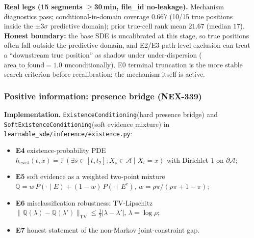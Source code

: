 \documentclass[11pt]{article}
\newcommand{\Aregion}{\mathcal{A}}
\renewcommand{\P}[1]{\mathbb{P}\left(#1\right)}
\newcommand{\ExistName}{\texttt{ExistenceConditioning}}
\newcommand{\SoftExistName}{\texttt{SoftExistenceConditioning}}
\begin{document}
\textbf{Real legs (15 segments $\ge$30\,min, file\_id no-leakage).}
Mechanism diagnostics pass; conditional-in-domain coverage $0.667$ (10/15
true positions inside the $\pm3\sigma$ predictive domain); prior true-cell
rank mean $21.67$ (median $17$).  \textbf{Honest boundary:} the base SDE is
uncalibrated at this stage, so true positions often fall outside the
predictive domain, and E2/E3 path-level exclusion can treat a ``downstream
true position'' as shadow under under-dispersion
($\mathrm{area\_to\_found}=1.0$ unconditionally).  E0 terminal truncation is
the more stable search criterion before recalibration; the mechanism itself
is active.

\subsubsection{Positive information: presence bridge (NEX-339)}
\label{sec:exp-b-exist}

\textbf{Implementation.} \ExistName (hard presence
bridge) and \SoftExistName (soft evidence mixture) in
\texttt{learnable\_sde/inference/existence.py}:
\begin{itemize}
\item \textbf{E4} existence-probability PDE
$h_{\mathrm{exist}}(t,x)=\P{\exists s{\in}[t,t_2]:X_s{\in}\Aregion\mid X_t{=}x}$
with Dirichlet $1$ on $\partial \Aregion$;
\item \textbf{E5} soft evidence as a weighted two-point mixture
$\mathbb{Q}=w\,P(\cdot{\mid}E)+(1-w)\,P(\cdot{\mid}E^c)$, $w=\rho\pi/
(\rho\pi+1-\pi)$;
\item \textbf{E6} misclassification robustness: TV-Lipschitz
$\|\mathbb{Q}(\lambda)-\mathbb{Q}(\lambda')\|_{\mathrm{TV}}\le
\tfrac12|\lambda-\lambda'|$, $\lambda=\log\rho$;
\item \textbf{E7} honest statement of the non-Markov joint-constraint gap.
\end{itemize}
\end{document}
